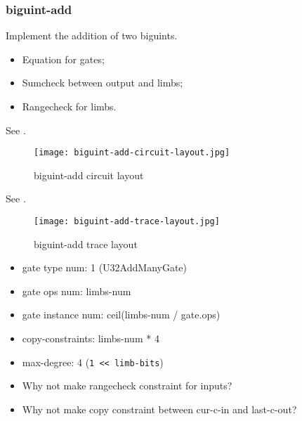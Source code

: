 \subsubsection{biguint-add}

Implement the addition of two biguints.

\begin{itemize}
    \item Equation for gates;
    \item Sumcheck between output and limbs;
    \item Rangecheck for limbs.
\end{itemize}

See .
\begin{figure}[!ht]
    \centering
    \texttt{[image: biguint-add-circuit-layout.jpg]}
    \caption{biguint-add circuit layout}
    \label{fig:biguint-add-circuit-layout}
\end{figure}

See .
\begin{figure}[!ht]
    \centering
    \texttt{[image: biguint-add-trace-layout.jpg]}
    \caption{biguint-add trace layout}
    \label{fig:biguint-add-trace-layout}
\end{figure}

\begin{itemize}
    \item gate type num: 1 (U32AddManyGate)
    \item gate ops num: limbs-num
    \item gate instance num: ceil(limbs-num / gate.ops)
    \item copy-constraints: limbs-num * 4
    \item max-degree: 4 (\verb|1 << limb-bits|)
\end{itemize}

\begin{itemize}
    \item Why not make rangecheck constraint for inputs?
    \item Why not make copy constraint between cur-c-in and last-c-out?
\end{itemize}
